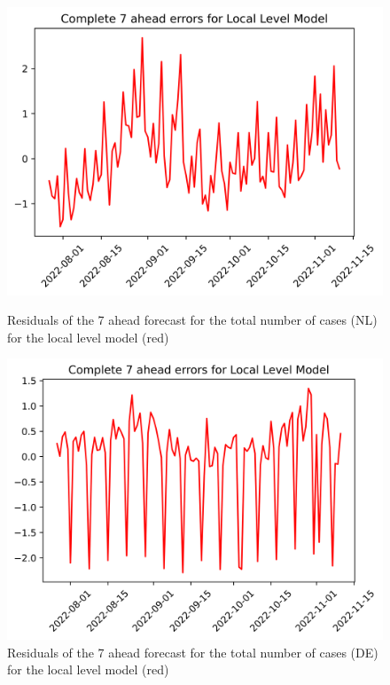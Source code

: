 
\begin{figure}

\begin{minipage}{.45\textwidth}
  \centering
  \includegraphics[width=\linewidth]{pics/7_ah/7_ahead_errors_Local Level Model.png}
  \caption{Residuals of the 7 ahead forecast for the total number of cases (NL) for the local level model (red)}
  \label{fig:tot_cases_error_7_LLM}
\end{minipage}
\begin{minipage}{.45\textwidth}
  \centering
  \includegraphics[width=\linewidth]{pics/7_ah/DE_7_ahead_errors_Local Level Model.png}
  \caption{Residuals of the 7 ahead forecast for the total number of cases (DE) for the local level model (red)}
  \label{fig:tot_cases_error_7_LLM_DE}
\end{minipage}

\end{figure}

